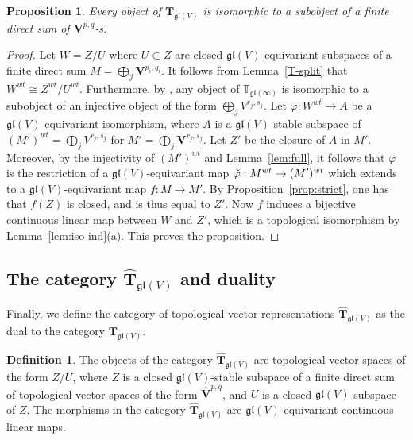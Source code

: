 \documentclass[12pt,reqno]{amsart}
\newtheorem{prop}[thm]{Proposition}
\theoremstyle{definition}
\newtheorem{defn}[thm]{Definition}
\theoremstyle{remark}
\begin{document}
	\begin{prop}\label{prop:sub}
	Every object of $\mathbf{T}_{\mathfrak{gl}(V)}$ is isomorphic to a subobject of a finite direct sum of $\mathbf{V}^{p,q}$-s.
	\end{prop}
	\begin{proof}
	Let $W = Z/U$ where $U\subset Z$ are closed $\mathfrak{gl}(V)$-equivariant subspaces of a finite direct sum $M = \bigoplus_j \mathbf{V}^{p_i,q_i} $. It follows from Lemma~\ref{T-split} that $W^{wt}\cong Z^{wt}/U^{wt}$. Furthermore, by \cite[Proposition 4.5]{DPS}, any object of $\mathbb{T}_{\mathfrak{gl}(\infty)}$ is isomorphic to a subobject of an injective object of the form $\bigoplus_j V^{r_j,s_j} $. Let $\varphi: W^{wt}\rightarrow A$ be a $\mathfrak{gl}(V)$-equivariant isomorphism, where $A$ is a $\mathfrak{gl}(V)$-stable subspace of 
	$( M' ) ^{wt}= \bigoplus_j V^{r_j,s_j} $  for $M' = \bigoplus_j \mathbf{V}^{r_j,s_j} $. Let $Z'$ be the closure of $A$ in $M'$. Moreover, by the injectivity of $( M' ) ^{wt} $ and Lemma~\ref{lem:full}, it follows that $\varphi$ is the restriction of a $\mathfrak{gl}(V)$-equivariant map $\Tilde{\varphi}: M^{wt} \rightarrow (M')^{wt}$ which extends to a 
	$\mathfrak{gl}(V)$-equivariant map $f: M \rightarrow M'$. By Proposition~\ref{prop:strict}, one has that $f(Z)$ is closed, and is thus equal to $Z'$. Now $f$ induces a bijective continuous linear map between $W$ and $Z'$, which is a topological isomorphism by Lemma~\ref{lem:iso-ind}(a). This proves the proposition.
	\end{proof}
	
	\subsection{The category $\widehat{{\mathbf T}}_{\mathfrak{gl}(V)}$ and duality}
	Finally, we define the category of topological vector representations $\widehat{{\mathbf T}}_{\mathfrak{gl}(V)}$ as the dual to the category $\mathbf{T}_{\mathfrak{gl}(V)}$.
	
	\begin{defn}
		The objects of the category $\widehat{{\mathbf T}}_{\mathfrak{gl}(V)}$ are topological vector spaces of the form $Z/U$, where $Z$ is a closed $\mathfrak{gl}(V)$-stable subspace of a finite direct sum of topological vector spaces of the form $\widehat{\mathbf{V}}^{p,q}$, and $U$ is a closed $\mathfrak{gl}(V)$-subspace of $Z$. The morphisms in the category $\widehat{\mathbf{T}}_{\mathfrak{gl}(V)}$ are $\mathfrak{gl}(V)$-equivariant continuous linear maps.
	\end{defn}
	
\end{document}
